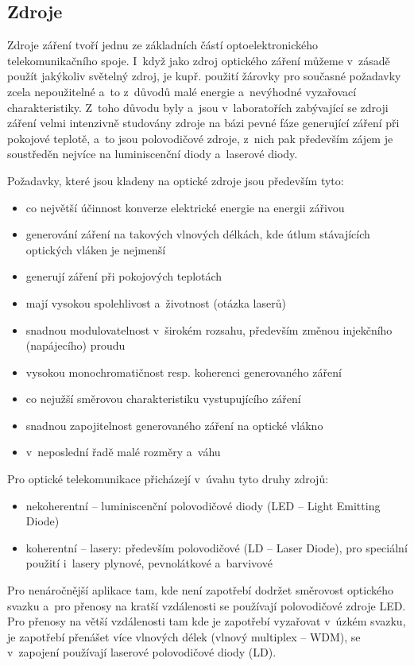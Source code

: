 \subsection{Zdroje}
Zdroje záření tvoří jednu ze základních částí optoelektronického telekomunikačního spoje. I~když jako zdroj optického záření můžeme v~zásadě použít jakýkoliv světelný zdroj, je kupř. použití žárovky pro současné požadavky zcela nepoužitelné a~to z~důvodů malé energie a~nevýhodné vyzařovací charakteristiky. Z~toho důvodu byly a~jsou v~laboratořích zabývající se zdroji záření velmi intenzivně studovány zdroje na bázi pevné fáze generující záření při pokojové teplotě, a~to jsou polovodičové zdroje, z~nich pak především zájem je soustředěn nejvíce na luminiscenční diody a~laserové diody.

Požadavky, které jsou kladeny na optické zdroje jsou především tyto:
\begin{itemize}
  \item co největší účinnost konverze elektrické energie na energii zářivou
  \item generování záření na takových vlnových délkách, kde útlum stávajících optických vláken je nejmenší
  \item generují záření při pokojových teplotách
  \item mají vysokou spolehlivost a~životnost (otázka laserů)
  \item snadnou modulovatelnost v~širokém rozsahu, především změnou injekčního (napájecího) proudu
  \item vysokou monochromatičnost resp. koherenci generovaného záření
  \item co nejužší směrovou charakteristiku vystupujícího záření
  \item snadnou zapojitelnost generovaného záření na optické vlákno
  \item v~neposlední řadě malé rozměry a~váhu
\end{itemize}

Pro optické telekomunikace přicházejí v~úvahu tyto druhy zdrojů:
\begin{itemize}
  \item nekoherentní – luminiscenční polovodičové diody (LED – Light Emitting Diode)
  \item koherentní – lasery: především polovodičové (LD – Laser Diode), pro speciální použití i~lasery plynové, pevnolátkové a~barvivové
\end{itemize}

Pro nenáročnější aplikace tam, kde není zapotřebí dodržet směrovost optického svazku a~pro přenosy na kratší vzdálenosti se používají polovodičové zdroje LED. Pro přenosy na větší vzdálenosti tam kde je zapotřebí vyzařovat v~úzkém svazku, je zapotřebí přenášet více vlnových délek (vlnový multiplex – WDM), se v~zapojení používají laserové polovodičové diody (LD).

